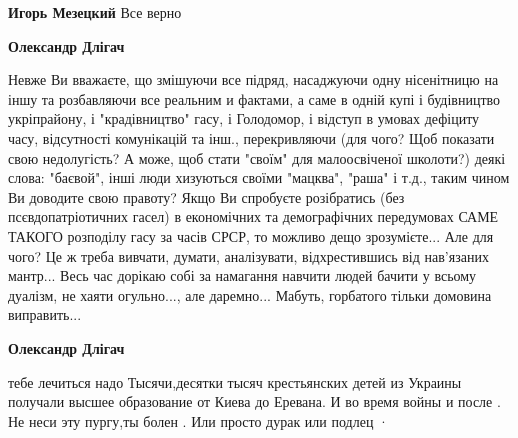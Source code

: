 \begin{itemize}
\begin{itemize}
\begin{itemize}
 
\textbf{Игорь Мезецкий} Все верно


 
\textbf{Олександр Длігач} 

Невже Ви вважаєте, що змішуючи все підряд, насаджуючи
одну нісенітницю на іншу та розбавляючи все реальним и фактами, а саме в одній
купі і будівництво укріпрайону, і "крадівництво" гасу, і Голодомор, і відступ в
умовах дефіциту часу, відсутності комунікацій та інш., перекривляючи (для чого?
Щоб показати свою недолугість? А може, щоб стати "своїм" для малоосвіченої
школоти?) деякі слова: "баєвой", інші люди хизуються своїми "мацква", "раша" і
т.д., таким чином Ви доводите свою правоту? Якщо Ви спробуєте розібратись (без
псєвдопатріотичних гасел) в економічних та демографічних передумовах САМЕ
ТАКОГО розподілу гасу за часів СРСР, то можливо дещо зрозумієте... Але для
чого? Це ж треба вивчати, думати, аналізувати, відхрестившись від нав'язаних
мантр... Весь час дорікаю собі за намагання навчити людей бачити у всьому
дуалізм, не хаяти огульно..., але даремно... Мабуть, горбатого тільки домовина
виправить...

 
\textbf{Олександр Длігач} 

тебе лечиться надо \Laughey[1.0][white] Тысячи,десятки тысяч крестьянских детей из Украины
получали высшее образование от Киева до Еревана. И во время войны и после . Не
неси эту пургу,ты болен . Или просто дурак или подлец · 


 

\end{itemize}
\end{itemize}
\end{itemize}
